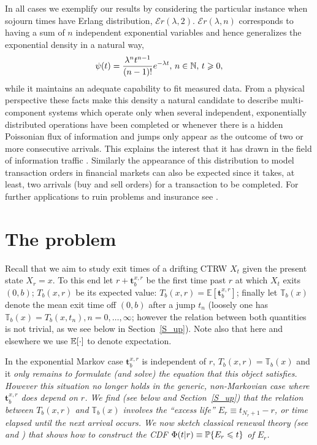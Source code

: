 \documentclass[english,aps,a4paper,twocolumn,showpacs,showkeys,amsfonts,amsmath,amssymb,amscd,nofootinbib]{revtex4}
\newcommand{\1}{\'\i}
\newcommand{\EE}{\mathbb{E}}
\newcommand{\TT}{\mathbb{T}}\newcommand{\FF}{\mathbb{F}}
\def\n{\nu}
\begin{document}
  In all cases we exemplify our results by considering the particular instance when
    sojourn times have
Erlang distribution, $\mathcal Er(\lambda,2)$. %
 $\mathcal Er(\lambda,n)$   corresponds to having a sum of $n$ independent exponential
variables and hence generalizes the exponential density in a
natural way, 
\begin{equation}
\psi(t)  = \frac{\lambda^n t^{n-1}}{(n-1)!} e^{-\lambda t},\, n\in \Bbb N,\, t\geqslant 0,  
\label{psi_E2}%
\end{equation}
while it maintains an adequate capability to fit
measured data. From a physical perspective   these facts make
 this density   a natural   candidate to describe  multi-component systems  which
operate  only when several independent, exponentially distributed
operations have been completed or whenever  there is  a hidden
Poissonian flux of information  and jumps only appear  as the
outcome of  two or more  consecutive arrivals.
 This explains the interest that
 it has drawn in the field  of information traffic
\cite{sb00,fc02}.   Similarly the appearance of this distribution
to model transaction orders in financial markets can also be
expected since
 it takes, at least, two arrivals (buy and sell orders) for  a transaction
to be completed.   For further applications to ruin problems and
insurance see  \cite{dh01,lg04}.


\section{\label{S2}The problem}


Recall that we  aim to   study exit times of a  drifting CTRW
$X_t$
 given the present state $ X_r=x$.  To this  end    let $r+\mathbf{t}_b^{x,r}$ be the first time past
$r$ at which $X_t$ exits $(0,b)$;   $T_{b}(x,r)$ be its expected
value: $T_{b}(x,r) =\EE[\mathbf{t}_b^{x,r}]$; finally let
$\TT_{b}(x) $ denote   the mean exit time   off $(0,b)$     after
a jump $t_n$ (loosely one has $\TT_{b}(x)=T_{b}(x,t_n), n=0,\dots,
\infty$; however the relation between both   quantities is not
trivial, as we see below in Section~\ref{S_up}). Note also that here and
elsewhere we use $\Bbb E[\cdot]$ to denote expectation.

   In the exponential Markov case    $
\mathbf{t}_b^{x,r}$ is independent of $r$, $T_{b}(x,r)=\TT_{b}(x)$
and it \it only \rm remains to formulate (and solve) the equation
that  this object satisfies. However this situation no longer
holds in the generic, non-Markovian case where    $
\mathbf{t}_b^{x,r}$ does depend on $r$. We find (see below and
Section~\ref{S_up}) that  the relation between $T_{b}(x,r)$ and
$\TT_{b}(x)$ involves     the  ``excess life'' $E_r\equiv
t_{N_r+1}-r$, or time elapsed   until  the next arrival    occurs.
We  now  sketch classical renewal theory (see \cite{kt81,c65}
 and  \cite{Go}) that
   shows how to construct  the CDF    $\Phi(t|r)\equiv
\Bbb P\{E_r\leqslant t\}$ of $E_r$.
\end{document}
